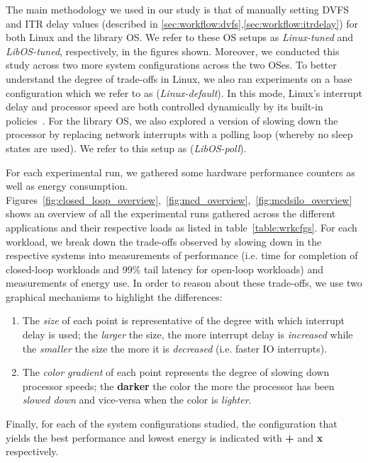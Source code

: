 \label{sec:exp}
The main methodology we used in our study is that of manually setting DVFS and ITR delay values (described in \cref{sec:workflow:dvfs},\cref{sec:workflow:itrdelay}) for both Linux and the library OS.
We refer to these OS setups as \textit{Linux-tuned} and \textit{LibOS-tuned}, respectively, in the figures shown.
Moreover, we conducted this study across two more system configurations across the two OSes.
To better understand the degree of trade-offs in Linux, we also ran experiments on a base configuration which we refer to as (\textit{Linux-default}). In this mode, Linux's interrupt delay and processor speed are both controlled dynamically by its built-in policies~\cite{cpufreq_governor,intelitr}.
For the library OS, we also explored a version of slowing down the processor by replacing network interrupts with a polling loop (whereby no sleep states are used). We refer to this setup as (\textit{LibOS-poll}).

For each experimental run, we gathered some hardware performance counters as well as energy consumption.
Figures~\ref{fig:closed_loop_overview},~\ref{fig:mcd_overview},~\ref{fig:mcdsilo_overview} shows an overview of all the experimental runs gathered across the different applications and their respective loads as listed in table~\ref{table:wrkcfgs}.
For each workload, we break down the trade-offs observed by slowing down in the respective systems into 
measurements of performance (i.e. time for completion of closed-loop workloads and 99\% tail latency for open-loop workloads) and measurements of energy use.
In order to reason about these trade-offs, we use two graphical mechanisms to highlight the differences:
\begin{enumerate}
    \item The \textit{size} of each point is representative of the degree with which interrupt delay is used; the {\larger[1]\textit{larger}} the size, the more interrupt delay is \textit{increased} while the \textit{smaller} the size the more it is \textit{decreased} (i.e. faster IO interrupts).
    \item The \textit{color gradient} of each point represents the degree of slowing down processor speeds; the \textbf{darker} the color the more the processor has been \textit{slowed down} and vice-versa when the color is \textit{lighter}.
\end{enumerate}
Finally, for each of the system configurations studied, the configuration that yields the best performance and lowest energy is indicated with {\larger[4]\textbf{+}} and {\larger[4]\textbf{x}} respectively.
